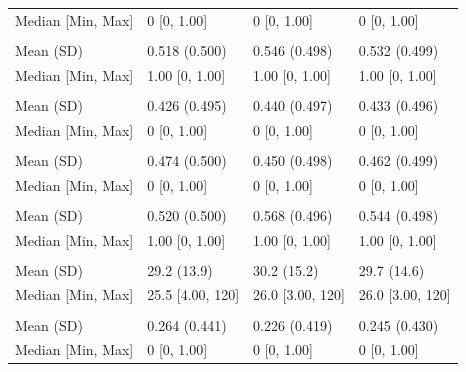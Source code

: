 \documentclass[smallextended]{svjour3}
\newenvironment{knitrout}{}{} %
\begin{document}
\begin{knitrout}
\begin{tabular}[t]{llll}
\hspace{1em}Median [Min, Max] & 0 [0, 1.00] & 0 [0, 1.00] & 0 [0, \vphantom{3} 1.00]\\
\addlinespace[0.3em]
\multicolumn{4}{l}{\textbf{z2}}\\
\hspace{1em}Mean (SD) & 0.518 (0.500) & 0.546 (0.498) & 0.532 (0.499)\\
\hspace{1em}Median [Min, Max] & 1.00 [0, 1.00] & 1.00 [0, 1.00] & 1.00 [0, \vphantom{1} 1.00]\\
\addlinespace[0.3em]
\multicolumn{4}{l}{\textbf{z3}}\\
\hspace{1em}Mean (SD) & 0.426 (0.495) & 0.440 (0.497) & 0.433 (0.496)\\
\hspace{1em}Median [Min, Max] & 0 [0, 1.00] & 0 [0, 1.00] & 0 [0, \vphantom{2} 1.00]\\
\addlinespace[0.3em]
\multicolumn{4}{l}{\textbf{z4}}\\
\hspace{1em}Mean (SD) & 0.474 (0.500) & 0.450 (0.498) & 0.462 (0.499)\\
\hspace{1em}Median [Min, Max] & 0 [0, 1.00] & 0 [0, 1.00] & 0 [0, \vphantom{1} 1.00]\\
\addlinespace[0.3em]
\multicolumn{4}{l}{\textbf{z5}}\\
\hspace{1em}Mean (SD) & 0.520 (0.500) & 0.568 (0.496) & 0.544 (0.498)\\
\hspace{1em}Median [Min, Max] & 1.00 [0, 1.00] & 1.00 [0, 1.00] & 1.00 [0, 1.00]\\
\addlinespace[0.3em]
\multicolumn{4}{l}{\textbf{size}}\\
\hspace{1em}Mean (SD) & 29.2 (13.9) & 30.2 (15.2) & 29.7 (14.6)\\
\hspace{1em}Median [Min, Max] & 25.5 [4.00, 120] & 26.0 [3.00, 120] & 26.0 [3.00, 120]\\
\addlinespace[0.3em]
\multicolumn{4}{l}{\textbf{grade3}}\\
\hspace{1em}Mean (SD) & 0.264 (0.441) & 0.226 (0.419) & 0.245 (0.430)\\
\hspace{1em}Median [Min, Max] & 0 [0, 1.00] & 0 [0, 1.00] & 0 [0, 1.00]\\

\end{tabular}
\end{knitrout}
\end{document}
